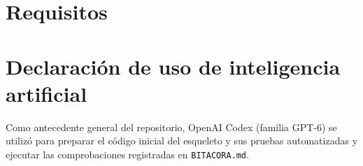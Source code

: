 \documentclass[11pt,a4paper]{article}
\begin{document}
\ByronPortada
\setcounter{page}{2}
\pagestyle{plain}
\ByronResumen
\ByronContexto
\ByronObjetivos

\CarlosTrabajosRelacionados

\section{Requisitos}
\ByronHistoriasUsuario

\CarlosRequisitosNoFuncionales






\CarlosRiesgosTecnicos



\ByronEvidenciasEsqueleto

\ByronTablaAportes

\section{Declaración de uso de inteligencia artificial}
Como antecedente general del repositorio, OpenAI Codex (familia GPT-6)
se utilizó para preparar el código inicial del esqueleto y sus pruebas
automatizadas y ejecutar las comprobaciones registradas en \texttt{BITACORA.md}.

\CarlosDeclaracionIA
\ByronDeclaracionIntegracion

\ByronDeclaracionesRegistradas

\printbibliography[heading=bibnumbered,title={Referencias}]
\end{document}
